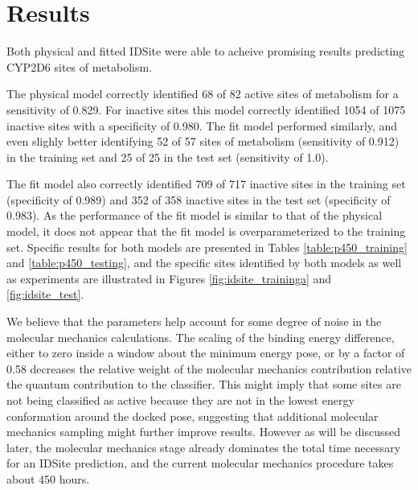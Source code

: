 \section{Results}
\label{section:p450/results}
Both physical and fitted IDSite were able to acheive promising results predicting CYP2D6 sites of metabolism.

The physical model correctly identified 68 of 82 active sites of metabolism for a sensitivity of 0.829.
For inactive sites this model correctly identified 1054 of 1075 inactive sites with a specificity of 0.980.
The fit model performed similarly, and even slighly better identifying 52 of 57 sites of metabolism (sensitivity of 0.912) in the training set and 25 of 25 in the test set (sensitivity of 1.0).




The fit model also correctly identified 709 of 717 inactive sites in the training set (specificity of 0.989) and 352 of 358 inactive sites in the test set (specificity of 0.983).
As the performance of the fit model is similar to that of the physical model, it does not appear that the fit model is overparameterized to the training set.
Specific results for both models are presented in Tables \ref{table:p450_training} and \ref{table:p450_testing}, and the specific sites identified by both models as well as experiments are illustrated in Figures \ref{fig:idsite_traininga} and \ref{fig:idsite_test}. 

We believe that the parameters help account for some degree of noise in the molecular mechanics calculations.
The scaling of the binding energy difference, either to zero inside a window about the minimum energy pose, or by a factor of 0.58 decreases the relative weight of the molecular mechanics contribution relative the quantum contribution to the classifier.
This might imply that some sites are not being classified as active because they are not in the lowest energy conformation around the docked pose, suggesting that additional molecular mechanics sampling might further improve results.
However as will be discussed later, the molecular mechanics stage already dominates the total time necessary for an IDSite prediction, and the current molecular mechanics procedure takes about 450 hours.




